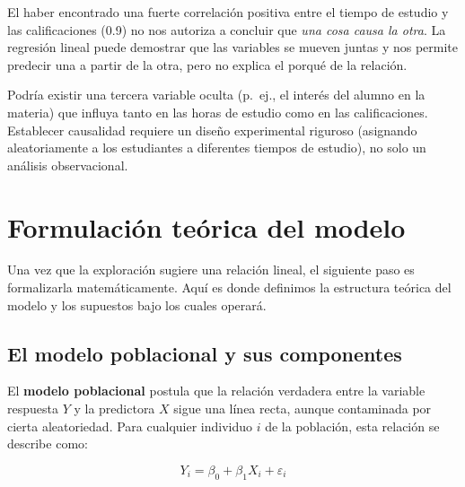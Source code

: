 \documentclass[
  letterpaper,
  DIV=11,
  numbers=noendperiod]{scrreprt}
\begin{document}
\begin{tcolorbox}[enhanced jigsaw, breakable, toprule=.15mm, bottomtitle=1mm, coltitle=black, colbacktitle=quarto-callout-warning-color!10!white, titlerule=0mm, opacitybacktitle=0.6, bottomrule=.15mm, toptitle=1mm, title=\textcolor{quarto-callout-warning-color}{\faExclamationTriangle}\hspace{0.5em}{¡Correlación no implica causalidad!}, arc=.35mm, rightrule=.15mm, opacityback=0, colframe=quarto-callout-warning-color-frame, leftrule=.75mm, left=2mm, colback=white]

El haber encontrado una fuerte correlación positiva entre el tiempo de
estudio y las calificaciones (0.9) no nos autoriza a concluir que
\emph{una cosa causa la otra}. La regresión lineal puede demostrar que
las variables se mueven juntas y nos permite predecir una a partir de la
otra, pero no explica el porqué de la relación.

Podría existir una tercera variable oculta (p.~ej., el interés del
alumno en la materia) que influya tanto en las horas de estudio como en
las calificaciones. Establecer causalidad requiere un diseño
experimental riguroso (asignando aleatoriamente a los estudiantes a
diferentes tiempos de estudio), no solo un análisis observacional.

\end{tcolorbox}

\section{Formulación teórica del
modelo}\label{formulaciuxf3n-teuxf3rica-del-modelo}

Una vez que la exploración sugiere una relación lineal, el siguiente
paso es formalizarla matemáticamente. Aquí es donde definimos la
estructura teórica del modelo y los supuestos bajo los cuales operará.

\subsection{El modelo poblacional y sus
componentes}\label{el-modelo-poblacional-y-sus-componentes}

El \textbf{modelo poblacional} postula que la relación verdadera entre
la variable respuesta \(Y\) y la predictora \(X\) sigue una línea recta,
aunque contaminada por cierta aleatoriedad. Para cualquier individuo
\(i\) de la población, esta relación se describe como:

\[
Y_i = \beta_0 + \beta_1 X_i + \varepsilon_i
\]
\end{document}
